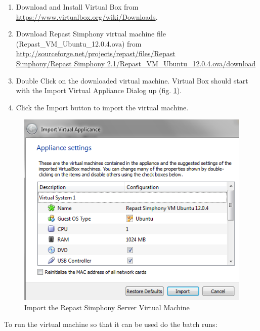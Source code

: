 \documentclass[11pt]{amsart}
\begin{document}
\begin{enumerate}
\item Download and Install Virtual Box from \href{https://www.virtualbox.org/wiki/Downloads}{https://www.virtualbox.org/wiki/Downloads}.
\item Download Repast Simphony  virtual machine file (Repast\_VM\_Ubuntu\_12.0.4.ova) from \href{http://sourceforge.net/projects/repast/files/Repast\%20Simphony/Repast\%20Simphony\%202.1/Repast_VM_Ubuntu_12.0.4.ova/download}
{http://sourceforge.net/projects/repast/files/Repast \\
Simphony/Repast Simphony 2.1/Repast\_VM\_Ubuntu\_12.0.4.ova/download}
\item Double Click on the downloaded virtual machine. Virtual Box should start with the Import Virtual Appliance Dialog up (fig. \ref{fig:import_vm}).
\item Click the Import button to import the virtual machine.
\end{enumerate}

\begin{figure}[h]
\begin{center}
\vspace{.2in}
\centerline {
\includegraphics[width=4.5in]{images/import_vm.png}
}
\caption{Import the Repast Simphony Server Virtual Machine}
\label{fig:import_vm}
\end{center}
\end{figure}

\noindent
To run the virtual machine so that it can be used do the batch runs:
\end{document}
